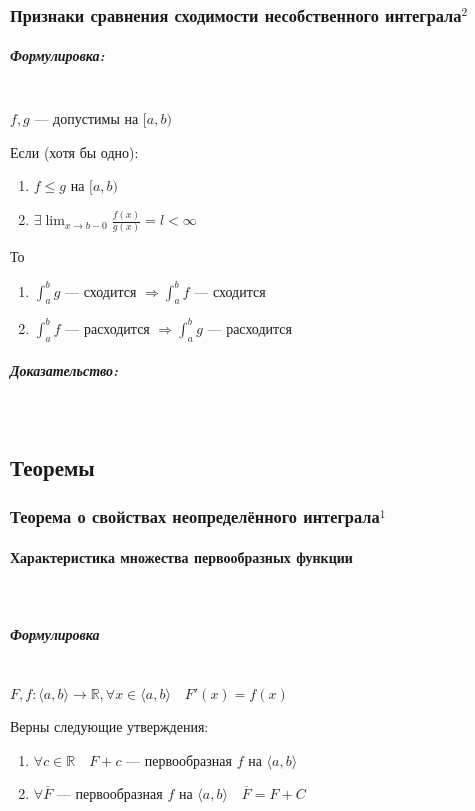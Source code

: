\documentclass{article}
\let\vanillaparagraph\paragraph
\let\vanillasubparagraph\subparagraph
\renewcommand{\paragraph}[1]{\vanillaparagraph{#1}\mbox{}\\}
\renewcommand{\subparagraph}[1]{\vanillasubparagraph{#1}\mbox{}\\}
\begin{document}
\subsubsection{Признаки сравнения сходимости несобственного интеграла\texorpdfstring{$^2$}{}}
\subparagraph{Формулировка:}

$f, g$ --- допустимы на $[a, b)$

Если (хотя бы одно):
\begin{enumerate}
    \item $f \le g$ на $[a, b)$
    \item $\exists \lim_{x \rightarrow b - 0} {\frac{f(x)}{g(x)}} = l < \infty$
\end{enumerate}

То
\begin{enumerate}
    \item $\int_a^b g$ --- сходится $\Rightarrow \int_a^b f$ --- сходится
    \item $\int_a^b f$ --- расходится $\Rightarrow \int_a^b g$ --- расходится
\end{enumerate}

\subparagraph{Доказательство:}



\newpage

\subsection{Теоремы}
\subsubsection{Теорема о свойствах неопределённого интеграла\texorpdfstring{$^1$}{}}
\paragraph{Характеристика множества первообразных функции}
\subparagraph{Формулировка}

$F, f: \langle a, b\rangle \rightarrow \mathbb{R}, \forall x \in \langle a, b\rangle \quad F'(x) = f(x)$

Верны следующие утверждения:
\begin{enumerate}
    \item $\forall c \in \mathbb{R} \quad F + c$ --- первообразная $f$ на $\langle a, b \rangle$
    \item $\forall \overline{F}$ --- первообразная $f$ на $\langle a, b\rangle \quad \overline{F} = F + C$
\end{enumerate}
\end{document}
